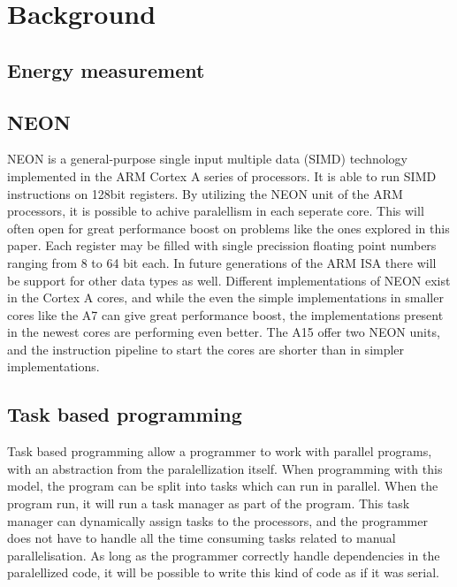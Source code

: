 \chapter[Background]{Background}

\section{Energy measurement}

\section{NEON}
NEON is a general-purpose single input multiple data (SIMD) technology implemented in the ARM Cortex A series of processors.
It is able to run SIMD instructions on 128bit registers.
By utilizing the NEON unit of the ARM processors, it is possible to achive paralellism in each seperate core.
This will often open for great performance boost on problems like the ones explored in this paper.
Each register may be filled with single precission floating point numbers ranging from 8 to 64 bit each.
In future generations of the ARM ISA there will be support for other data types as well.
Different implementations of NEON exist in the Cortex A cores, and while the even the simple implementations in smaller cores like the A7 can give great performance boost, the implementations present in the newest cores are performing even better.
The A15 offer two NEON units, and the instruction pipeline to start the cores are shorter than in simpler implementations.



\section{Task based programming}
Task based programming allow a programmer to work with parallel programs, with an abstraction from the paralellization itself.
When programming with this model, the program can be split into tasks which can run in parallel.
When the program run, it will run a task manager as part of the program.
This task manager can dynamically assign tasks to the processors, and the programmer does not have to handle all the time consuming tasks related to manual parallelisation.
As long as the programmer correctly handle dependencies in the paralellized code, it will be possible to write this kind of code as if it was serial.

